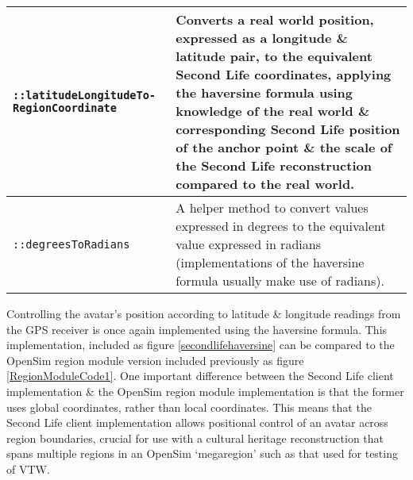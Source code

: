 \begin{center}
\begin{longtable}{| p{4.2cm} | p{10cm} |}
\texttt{::latitudeLongitudeTo- RegionCoordinate} & Converts a real world position, expressed as a longitude \& latitude pair, to the equivalent Second Life coordinates, applying the haversine formula using knowledge of the real world \& corresponding Second Life position of the anchor point \& the scale of the Second Life reconstruction compared to the real world. \\
		
\hline


\texttt{::degreesToRadians} & A helper method to convert values expressed in degrees to the equivalent value expressed in radians (implementations of the haversine formula usually make use of radians). \\
		
\hline


\end{longtable}
\end{center}


Controlling the avatar's position according to latitude \& longitude readings from the GPS receiver is once again implemented using the haversine formula. This implementation, included as figure \ref{secondlifehaversine} can be compared to the OpenSim region module version included previously as figure \ref{RegionModuleCode1}. One important difference between the Second Life client implementation \& the OpenSim region module implementation is that the former uses global coordinates, rather than local coordinates\regionmodulelimitationFootnote{}. This means that the Second Life client implementation allows positional control of an avatar across region boundaries, crucial for use with a cultural heritage reconstruction that spans multiple regions in an OpenSim `megaregion'\megaregionFootnote{} such as that used for testing of VTW.


